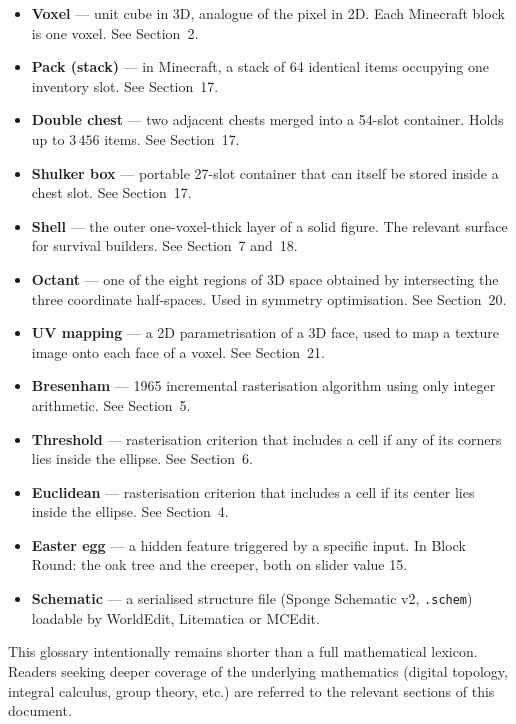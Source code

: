 \documentclass[12pt,a4paper]{scrartcl}
\newcommand{\code}[1]{\texttt{\small #1}}
\begin{document}
\begin{itemize}[leftmargin=1.4em,itemsep=0.18em,topsep=0.3em]
  \item \textbf{Voxel} --- unit cube in 3D, analogue of the pixel in 2D. Each Minecraft block is one voxel. See Section~2.
  \item \textbf{Pack (stack)} --- in Minecraft, a stack of 64 identical items occupying one inventory slot. See Section~17.
  \item \textbf{Double chest} --- two adjacent chests merged into a 54-slot container. Holds up to $3\,456$ items. See Section~17.
  \item \textbf{Shulker box} --- portable 27-slot container that can itself be stored inside a chest slot. See Section~17.
  \item \textbf{Shell} --- the outer one-voxel-thick layer of a solid figure. The relevant surface for survival builders. See Section~7 and~18.
  \item \textbf{Octant} --- one of the eight regions of 3D space obtained by intersecting the three coordinate half-spaces. Used in symmetry optimisation. See Section~20.
  \item \textbf{UV mapping} --- a 2D parametrisation of a 3D face, used to map a texture image onto each face of a voxel. See Section~21.
  \item \textbf{Bresenham} --- 1965 incremental rasterisation algorithm using only integer arithmetic. See Section~5.
  \item \textbf{Threshold} --- rasterisation criterion that includes a cell if any of its corners lies inside the ellipse. See Section~6.
  \item \textbf{Euclidean} --- rasterisation criterion that includes a cell if its center lies inside the ellipse. See Section~4.
  \item \textbf{Easter egg} --- a hidden feature triggered by a specific input. In Block Round: the oak tree and the creeper, both on slider value 15.
  \item \textbf{Schematic} --- a serialised structure file (Sponge Schematic v2, \code{.schem}) loadable by WorldEdit, Litematica or MCEdit.
\end{itemize}

This glossary intentionally remains shorter than a full mathematical lexicon. Readers seeking deeper coverage of the underlying mathematics (digital topology, integral calculus, group theory, etc.) are referred to the relevant sections of this document.
\end{document}
